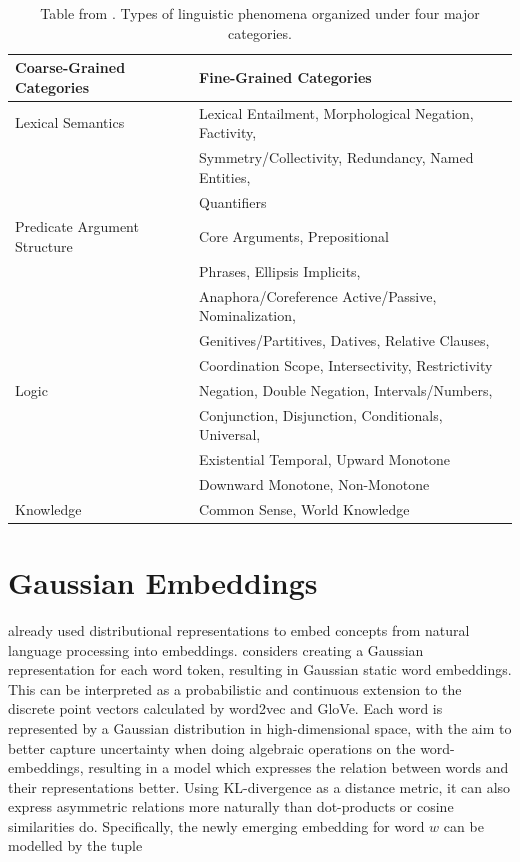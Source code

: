 \documentclass[a4paper,12pt,oneside,openright]{report}
\begin{document}
\begin{table}[h!]
\centering
\begin{tabular}{l l} 
 \hline
 Coarse-Grained Categories & Fine-Grained Categories \\ [0.5ex] 
 \hline
 Lexical Semantics & Lexical Entailment, Morphological Negation, Factivity, \\
&  Symmetry/Collectivity, Redundancy, Named Entities, \\
& Quantifiers \\ 
Predicate Argument Structure & Core Arguments, Prepositional \\ & Phrases, Ellipsis \/ Implicits, \\
& Anaphora/Coreference Active/Passive, Nominalization, \\
& Genitives/Partitives, Datives, Relative Clauses, \\
& Coordination Scope, Intersectivity, Restrictivity \\
Logic & Negation, Double Negation, Intervals/Numbers, \\
& Conjunction, Disjunction, Conditionals, Universal, \\
& Existential Temporal, Upward Monotone \\
& Downward Monotone, Non-Monotone \\
Knowledge & Common Sense, World Knowledge \\ [1ex] 
\hline
\end{tabular}
\caption{Table from \cite{wang19}. Types of linguistic phenomena organized under four major categories.}
\label{table:1}
\end{table}

\section{Gaussian Embeddings}\label{appendix:GaussianEmbeddings}

\cite{bengio06} already used distributional representations to embed concepts from natural language processing into embeddings.
\cite{vilnis14} considers creating a Gaussian representation for each word token, resulting in Gaussian static word embeddings.
This can be interpreted as a probabilistic and continuous extension to the discrete point vectors calculated by word2vec and GloVe.
Each word is represented by a Gaussian distribution in high-dimensional space, with the aim to better capture uncertainty when doing algebraic operations on the word-embeddings, resulting in a model which expresses the relation between words and their representations better.
Using KL-divergence as a distance metric, it can also express asymmetric relations more naturally than dot-products or cosine similarities do.  
Specifically, the newly emerging embedding for word $w$ can be modelled by the tuple 
\end{document}
